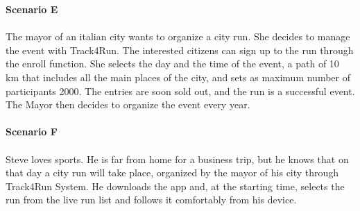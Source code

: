 \textbf{Scenario E} \\ \\ 
The mayor of an italian city wants to organize a city run. She decides to manage the event with Track4Run. The interested citizens can sign up to the run through the enroll function. She selects the day and the time of the event, a path of 10 km that includes all the main places of the city, and sets as maximum number of participants 2000. The entries are soon sold out, and the run is a successful event. The Mayor then decides to organize the event every year. \\ \\
\textbf{Scenario F} \\ \\
Steve loves sports. He is far from home for a business trip, but he knows that on that day a city run will take place, organized by the mayor of his city through Track4Run System. He downloads the app and, at the starting time, selects the run from the live run list and follows it comfortably from his device. 





